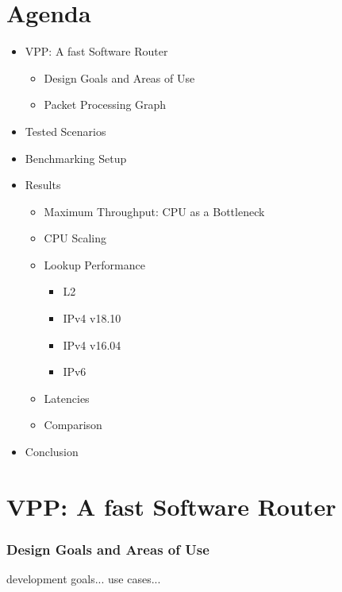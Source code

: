 \section{Agenda}

\begin{frame}
    \begin{itemize}
            \item VPP: A fast Software Router
            \begin{itemize}
                \item Design Goals and Areas of Use
                \item Packet Processing Graph
            \end{itemize}
            \item Tested Scenarios
            \item Benchmarking Setup
            \item Results
            \begin{itemize}
                \item Maximum Throughput: CPU as a Bottleneck
                \item CPU Scaling
                \item Lookup Performance
                \begin{itemize}
                    \item L2
                    \item IPv4 v18.10
                    \item IPv4 v16.04
                    \item IPv6
                \end{itemize}
                \item Latencies
                \item Comparison
            \end{itemize}
            \item Conclusion
        \end{itemize}
\end{frame}

\section{VPP: A fast Software Router}

\begin{frame}
    \frametitle{Design Goals and Areas of Use}
    development goals...
    use cases...

\end{frame}

